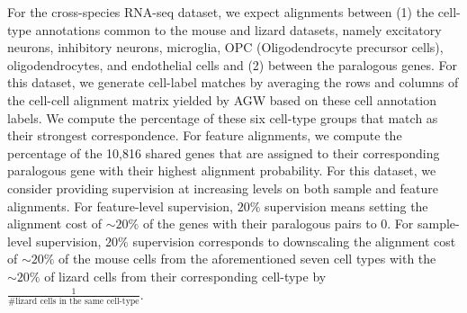 For the cross-species RNA-seq dataset, we expect alignments between (1) the cell-type annotations
common to the mouse and lizard datasets, namely excitatory neurons, inhibitory neurons,
microglia, OPC (Oligodendrocyte precursor cells), oligodendrocytes, and endothelial cells
and (2) between the paralogous genes. For this dataset, we generate cell-label matches
by averaging the rows and columns of the cell-cell alignment matrix yielded by AGW based on
these cell annotation labels. We compute the percentage of these six cell-type groups that
match as their strongest correspondence. For feature alignments, we compute the percentage
of the 10,816 shared genes that are assigned to their corresponding paralogous gene with
their highest alignment probability. For this dataset, we consider providing supervision at
increasing levels on both sample and feature alignments. For feature-level supervision,
$20\%$ supervision means setting the alignment cost of $\sim 20\%$ of the genes with
their paralogous pairs to $0$. For sample-level supervision, $20\%$ supervision corresponds
to downscaling the alignment cost of $\sim 20\%$ of the mouse cells from the aforementioned
seven cell types with the $\sim 20\%$ of lizard cells from their corresponding cell-type by
$\frac{1}{\textrm{\# lizard cells in the same cell-type}}$.


